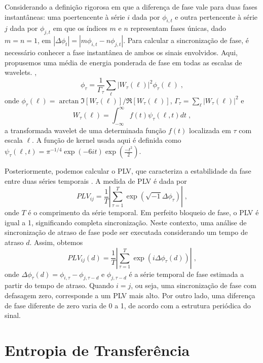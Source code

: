 \documentclass[
	12pt,				%
	openright,			%
	twoside,			%
	a4paper,			%
	english,			%
	french,				%
	spanish,			%
	brazil				%
	]{abntex2}
\begin{document}
 Considerando a definição rigorosa em que a diferença de fase vale para duas fases instantâneas: uma poertencente à série $i$ dada por $\phi_{i,t}$ e outra pertencente à série $j$ dada por $\phi_{j,t}$ em que os índices $m$ e $n$ representam fases únicas, dado  $m=n=1$, em 
$|\Delta\phi_t|=|m\phi_{i,t}-n\phi_{j,t}|$. 
Para calcular a sincronização de fase, é necessário conhecer a fase instantânea de ambos os sinais envolvidos. Aqui, propusemos uma média de energia ponderada de fase em todas as escalas de wavelets. \cite{Rodrigues2014},
\begin{equation}
\phi_\tau=\frac{1}{\Gamma_\tau}\sum_\ell|W_\tau(\ell)|^2\phi_\tau(\ell)\;,
\end{equation}
onde $\phi_\tau (\ell)=\arctan\Im[W_\tau(\ell)]/\Re[W_\tau(\ell)]$, 
$\Gamma_\tau=\sum_\ell|W_\tau(\ell)|^2$ e
\begin{equation}
W_\tau(\ell)=\int_{-\infty}^{\infty}f(t)\psi_\tau(\ell,t)dt\;,
\end{equation}
 a transformada wavelet de uma determinada função $f(t)$ localizada em $\tau$ com escala $\ell$. A função de kernel usada aqui é definida como $\psi_\tau(\ell,t)=\pi^{-1/4}\exp(-6{i}t)\exp(\frac{-t^2}{2})$.

Posteriormente, podemos calcular o PLV, que caracteriza a estabilidade da fase entre duas séries temporais \cite{boccaletti2001unifying}. A medida de PLV é dada por
\begin{equation}
{PLV}_{ij}=\frac{1}{T}\left|\sum_{\tau=1}^{T}\exp({ 
\sqrt{-1}}\Delta\phi_\tau)\right|\;,
\end{equation}
onde $T$ é o comprimento da série temporal. Em perfeito bloqueio de fase, o PLV é igual a 1, significando completa sincronização. Neste contexto, uma análise de sincronização de atraso de fase pode ser executada considerando um tempo de atraso  $d$. Assim, obtemos
\begin{equation}
{ PLV}_{ij}(d)=\frac{1}{T}\left|\sum_{\tau=1}^{T}\exp({ 
i}\Delta\phi_\tau(d))\right|\;,
\end{equation}
onde {$\Delta\phi_\tau(d)=\phi_{i,\tau}-\phi_{j,\tau-d}$ e 
$\phi_{j,\tau-d}$ é a série temporal de fase estimada a partir do tempo de atraso}. Quando $i=j$, ou seja, uma sincronização de fase com defasagem zero, corresponde a um PLV mais alto. Por outro lado, uma diferença de fase diferente de zero varia de 0 a 1, de acordo com a estrutura periódica do sinal.

\section{Entropia de Transferência}
\end{document}

